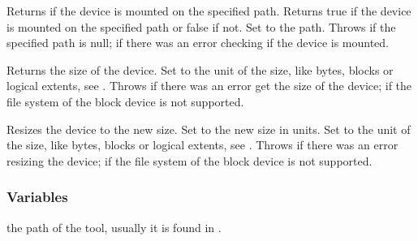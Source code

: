  Returns if the device is mounted on the 
specified path. Returns true if the device is mounted on the specified path or
false if not. Set  to the \TypeFile{} path.
Throws  if the specified path is null;
 if there was an error checking if the device is mounted.

 Returns the size of the device. 
Set  to the unit of the size, like bytes, blocks or logical 
extents, see .
Throws  if there was an error get the size of the device;
 if the file system of the block device is not supported.

 Resizes the device to the new size.
Set  to the new size in units.
Set  to the unit of the size, like bytes, blocks or logical 
extents, see .
Throws  if there was an error resizing the device;
 if the file system of the block device is not supported.

\subsubsection*{Variables}

 the path of the  tool, usually it is found in .

